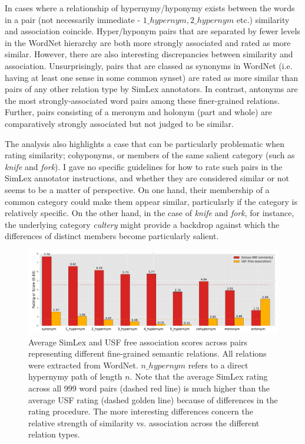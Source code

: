 In cases where a relationship of hypernymy/hyponymy exists between the words in a pair (not necessarily immediate - \(1\_hypernym, 2\_hypernym\) etc.) similarity and association coincide. Hyper/hyponym pairs that are separated by fewer levels in the WordNet hierarchy are both more strongly associated and rated as more similar. However, there are also interesting discrepancies between similarity and association. Unsurprisingly, pairs that are classed as synonyms in WordNet (i.e. having at least one sense in some common synset) are rated as more similar than pairs of any other relation type by SimLex annotators. In contrast, antonyms are the most strongly-associated word pairs among these finer-grained relations. Further, pairs consisting of a meronym and holonym (part and whole) are comparatively strongly associated but not judged to be similar. 

The analysis also highlights a case that can be particularly problematic when rating similarity;  cohyponyms, or members of the same salient category (such as \emph{knife} and \emph{fork}). I gave no specific guidelines for how to rate such pairs in the SimLex annotator instructions, and whether they are considered similar or not seems to be a matter of perspective. On one hand, their membership of a common category could make them appear similar, particularly if the category is relatively specific. On the other hand, in the case of \emph{knife} and \emph{fork}, for instance, the underlying category \emph{cultery} might provide a backdrop against which the differences of distinct members become particularly salient. 

\begin{figure}[ht]  \includegraphics[width =\textwidth]{Chapter_2/simlex_relations_CL}  \caption{\label{fig6} Average SimLex and USF free association scores across pairs representing different fine-grained semantic relations. All relations were extracted from WordNet. \(n\_hypernym\) refers to a direct hypernymy path of length \(n\). Note that the average SimLex rating across all 999 word pairs (dashed red line) is much higher than the average USF rating (dashed golden line) because of differences in the rating procedure. The more interesting differences concern the relative strength of similarity vs. association across the different relation types.}\end{figure}  

